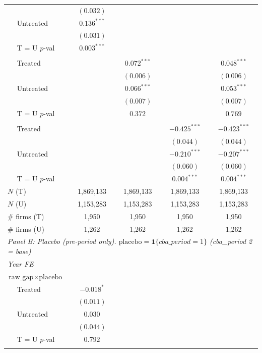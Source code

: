 \begin{table}[H]
\begin{tabular}{lcccc}
 & $(0.032)$ &  &  &  \\
$\quad$ Untreated & $0.136^{***}$ &  &  &  \\
 & $(0.031)$ &  &  &  \\
$\quad$ T = U $p$-val & $0.003^{***}$ &  &  &  \\
\addlinespace[2pt]
\multicolumn{5}{l}{$\text{gap} \times \text{post}$} \\
$\quad$ Treated &  & $0.072^{***}$ &  & $0.048^{***}$ \\
 &  & $(0.006)$ &  & $(0.006)$ \\
$\quad$ Untreated &  & $0.066^{***}$ &  & $0.053^{***}$ \\
 &  & $(0.007)$ &  & $(0.007)$ \\
$\quad$ T = U $p$-val &  & $0.372$ &  & $0.769$ \\
\addlinespace[2pt]
\multicolumn{5}{l}{$\text{surplus} \times \text{post}$} \\
$\quad$ Treated &  &  & $-0.425^{***}$ & $-0.423^{***}$ \\
 &  &  & $(0.044)$ & $(0.044)$ \\
$\quad$ Untreated &  &  & $-0.210^{***}$ & $-0.207^{***}$ \\
 &  &  & $(0.060)$ & $(0.060)$ \\
$\quad$ T = U $p$-val &  &  & $0.004^{***}$ & $0.004^{***}$ \\
\addlinespace[2pt]
$N$ (T) & 1,869,133 & 1,869,133 & 1,869,133 & 1,869,133 \\
$N$ (U) & 1,153,283 & 1,153,283 & 1,153,283 & 1,153,283 \\
\# firms (T) & 1,950 & 1,950 & 1,950 & 1,950 \\
\# firms (U) & 1,262 & 1,262 & 1,262 & 1,262 \\
\midrule
\multicolumn{5}{l}{\textit{Panel B: Placebo (pre-period only). $\text{placebo} = \mathbf{1}\{cba\_period = 1\}$ (cba\_period 2 = base)}} \\
\midrule
\multicolumn{5}{l}{\textit{Year FE}} \\
\multicolumn{5}{l}{$\text{raw\_gap} \times \text{placebo}$} \\
$\quad$ Treated & $-0.018^{*}$ &  &  &  \\
 & $(0.011)$ &  &  &  \\
$\quad$ Untreated & $0.030$ &  &  &  \\
 & $(0.044)$ &  &  &  \\
$\quad$ T = U $p$-val & $0.792$ &  &  &  \\
\addlinespace[2pt]
\multicolumn{5}{l}{$\text{gap} \times \text{placebo}$} \\

\end{tabular}
\end{table}
